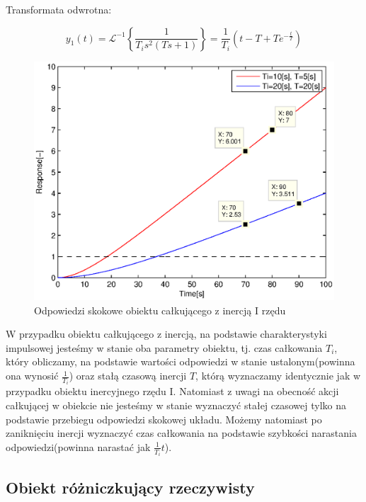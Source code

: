 \documentclass[12pt]{article}
\begin{document}
Transformata odwrotna:

\begin{equation*}
	y_{1}(t)=\mathcal{L}^{-1}\left\{\frac{1}{T_is^2(Ts+1)}\right\} =
	\frac{1}{T_i}\left(t - T + Te^{-\frac{t}{T}}\right)
\end{equation*}

\begin{figure}[!htb]
	\begin{center}
		\includegraphics[width=14cm]{../res/img/step4.eps}
	\end{center}
	\caption{Odpowiedzi skokowe obiektu całkującego z inercją I rzędu}
\end{figure}

W przypadku obiektu całkującego z inercją, na podstawie charakterystyki
impulsowej jesteśmy w stanie oba parametry obiektu, tj. czas całkowania $T_i$,
który obliczamy, na podstawie wartości odpowiedzi w stanie ustalonym(powinna
ona wynosić $\frac{1}{T_i}$) oraz stałą czasową inercji $T$, którą wyznaczamy
identycznie jak w przypadku obiektu inercyjnego rzędu I. Natomiast z uwagi na
obecność akcji całkującej w obiekcie nie jesteśmy w stanie wyznaczyć stałej
czasowej tylko na podstawie przebiegu odpowiedzi skokowej układu. Możemy
natomiast po zaniknięciu inercji wyznaczyć czas całkowania na podstawie
szybkości narastania odpowiedzi(powinna narastać jak $\frac{1}{T_i}t$).

\newpage

\subsection{Obiekt różniczkujący rzeczywisty}
\end{document}
